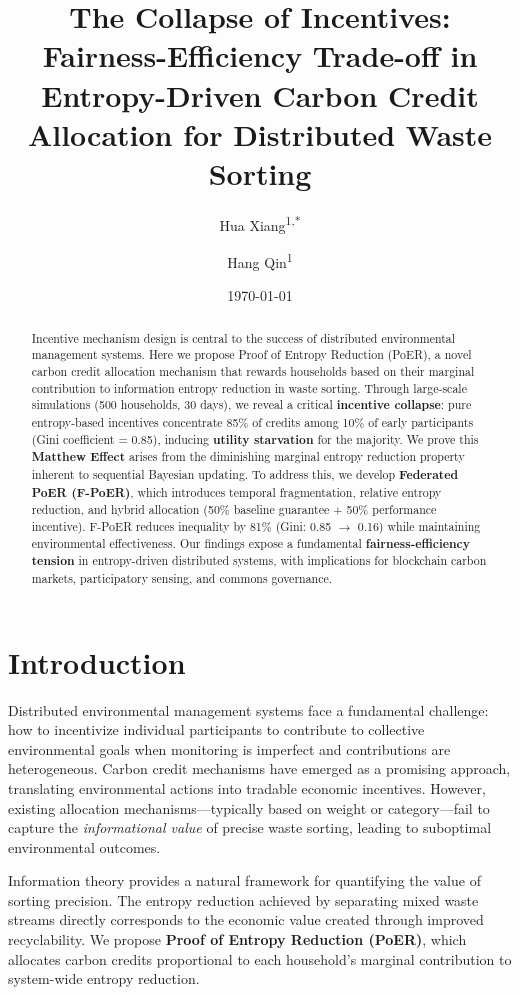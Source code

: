 \documentclass[12pt,a4paper]{article}
\title{The Collapse of Incentives: Fairness-Efficiency Trade-off in Entropy-Driven Carbon Credit Allocation for Distributed Waste Sorting}
\author{Hua Xiang\textsuperscript{1,*} \and Hang Qin\textsuperscript{1}}
\affil{\textsuperscript{1}School of Computer Science, Yangtze University, Jingzhou, China}
\affil{*\texttt{xianghua@yangtzeu.edu.cn}}
\affil{\texttt{68681700@qq.com}}
\date{\today}
\begin{document}
\maketitle

\begin{abstract}
Incentive mechanism design is central to the success of distributed environmental management systems. Here we propose Proof of Entropy Reduction (PoER), a novel carbon credit allocation mechanism that rewards households based on their marginal contribution to information entropy reduction in waste sorting. Through large-scale simulations (500 households, 30 days), we reveal a critical \textbf{incentive collapse}: pure entropy-based incentives concentrate 85\% of credits among 10\% of early participants (Gini coefficient = 0.85), inducing \textbf{utility starvation} for the majority. We prove this \textbf{Matthew Effect} arises from the diminishing marginal entropy reduction property inherent to sequential Bayesian updating. To address this, we develop \textbf{Federated PoER (F-PoER)}, which introduces temporal fragmentation, relative entropy reduction, and hybrid allocation (50\% baseline guarantee + 50\% performance incentive). F-PoER reduces inequality by 81\% (Gini: 0.85 $\rightarrow$ 0.16) while maintaining environmental effectiveness. Our findings expose a fundamental \textbf{fairness-efficiency tension} in entropy-driven distributed systems, with implications for blockchain carbon markets, participatory sensing, and commons governance.
\end{abstract}

\section{Introduction}

Distributed environmental management systems face a fundamental challenge: how to incentivize individual participants to contribute to collective environmental goals when monitoring is imperfect and contributions are heterogeneous. Carbon credit mechanisms have emerged as a promising approach, translating environmental actions into tradable economic incentives\cite{coase1960problem}. However, existing allocation mechanisms—typically based on weight or category—fail to capture the \textit{informational value} of precise waste sorting, leading to suboptimal environmental outcomes.

Information theory provides a natural framework for quantifying the value of sorting precision. The entropy reduction achieved by separating mixed waste streams directly corresponds to the economic value created through improved recyclability\cite{shannon1948mathematical}. We propose \textbf{Proof of Entropy Reduction (PoER)}, which allocates carbon credits proportional to each household's marginal contribution to system-wide entropy reduction.
\end{document}
